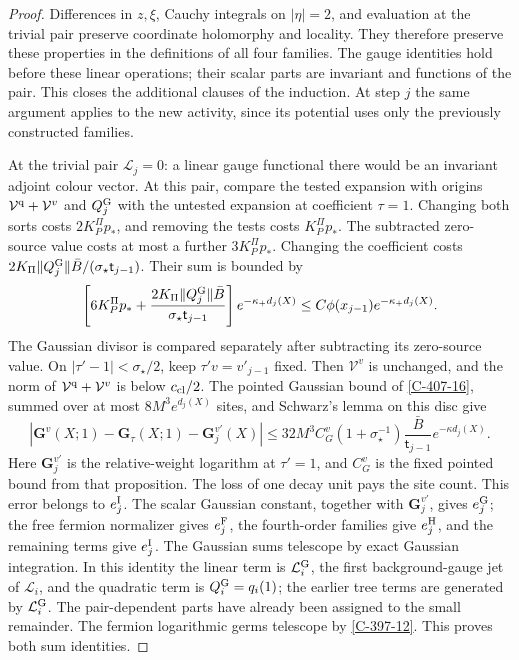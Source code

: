 \documentclass[11pt,letterpaper,reqno]{amsart}
\theoremstyle{definition}
\theoremstyle{remark}
\begin{document}
\begin{proof}
Differences in $z,\xi$, Cauchy integrals on
$|\eta|=2$, and evaluation at the trivial pair
preserve coordinate holomorphy and locality.
They therefore preserve these properties in the
definitions of all four families. The gauge
identities hold before these linear operations;
their scalar parts are invariant and functions
of the pair. This closes the additional clauses
of the induction. At step $j$ the same argument
applies to the new activity, since its potential
uses only the previously constructed families.

At the trivial pair $\mathcal L_j=0$: a linear gauge functional
there would be an invariant adjoint colour vector. At this pair, compare the tested expansion with origins
$\mathcal V^{\rm q}+\mathcal V^v$ and $Q_j^{\rm G}$ with
the untested expansion at coefficient $\tau=1$.
Changing both sorts costs $2K_P^\Pi p_*$, and removing
the tests costs $K_P^\Pi p_*$. The subtracted zero-source
value costs at most a further $3K_P^\Pi p_*$.
Changing the coefficient costs
$2K_\Pi\|Q_j^{\rm G}\|\bar B/(\sigma_\star\mathsf t_{j-1})$.
Their sum is bounded by
\[
 \left[6K_P^\Pi p_*+
 \frac{2K_\Pi\|Q_j^{\rm G}\|\bar B}
 {\sigma_\star\mathsf t_{j-1}}\right]e^{-\kappa_+d_j(X)}
       \le C\phi(x_{j-1})e^{-\kappa_+d_j(X)}.
\]
The Gaussian divisor is compared separately after subtracting
its zero-source value. On $|\tau'-1|<\sigma_\star/2$,
keep $\tau'v=v'_{j-1}$ fixed. Then $\mathcal V^v$ is
unchanged, and the norm of $\mathcal V^{\rm q}+\mathcal V^v$
is below $c_{\rm cl}/2$. The pointed Gaussian bound of
\cref{C-407-16}, summed over at most $8M^3e^{d_j(X)}$
sites, and Schwarz's lemma on this disc give
\[
 |\mathbf G^v(X;1)-\mathbf G_\tau(X;1)
                    -\mathbf G^{v'}_j(X)|
 \le32M^3C_G^v(1+\sigma_\star^{-1})
       \frac{\bar B}{\mathsf t_{j-1}}e^{-\kappa d_j(X)}.
\]
Here $\mathbf G^{v'}_j$ is the relative-weight logarithm
at $\tau'=1$, and $C_G^v$ is the fixed pointed bound from
that proposition. The loss of one decay unit pays the site
count. This error belongs to $e_j^{\rm I}$.
The scalar Gaussian constant, together with
$\mathbf G^{v'}_j$, gives $e_j^{\rm G}$; the free fermion
normalizer gives $e_j^{\rm F}$, the fourth-order families give
$e_j^{\rm H}$, and the remaining terms give $e_j^{\rm I}$. The Gaussian sums telescope
by exact Gaussian integration. In this identity the linear term is
$\mathcal L_i^{\rm G}$, the first background-gauge jet of
$\mathcal L_i$, and the quadratic term is $Q_i^{\rm G}=q_i(1)$;
the earlier tree terms are generated by $\mathcal L_i^{\rm G}$.
The pair-dependent parts have already been assigned to the small
remainder. The fermion logarithmic germs telescope by
\cref{C-397-12}. This proves both sum identities.


\end{proof}
\end{document}
